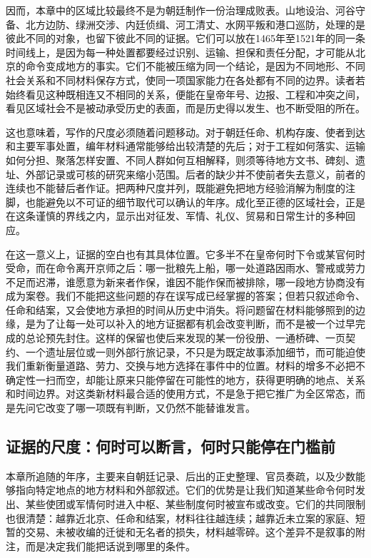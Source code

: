 因而，本章中的区域比较最终不是为朝廷制作一份治理成败表。山地设治、河谷守备、北方边防、绿洲交涉、内廷侦缉、河工清丈、水网平叛和港口巡防，处理的是彼此不同的对象，也留下彼此不同的证据。它们可以放在1465年至1521年的同一条时间线上，是因为每一种处置都要经过识别、运输、担保和责任分配，才可能从北京的命令变成地方的事实。它们不能被压缩为同一个结论，是因为不同地形、不同社会关系和不同材料保存方式，使同一项国家能力在各处都有不同的边界。读者若始终看见这种既相连又不相同的关系，便能在皇帝年号、边报、工程和冲突之间，看见区域社会不是被动承受历史的表面，而是历史得以发生、也不断受阻的所在。

这也意味着，写作的尺度必须随着问题移动。对于朝廷任命、机构存废、使者到达和主要军事处置，编年材料通常能够给出较清楚的先后；对于工程如何落实、运输如何分担、聚落怎样安置、不同人群如何互相解释，则须等待地方文书、碑刻、遗址、外部记录或可核的研究来缩小范围。后者的缺少并不使前者失去意义，前者的连续也不能替后者作证。把两种尺度并列，既能避免把地方经验消解为制度的注脚，也能避免以不可证的细节取代可以确认的年序。成化至正德的区域社会，正是在这条谨慎的界线之内，显示出对征发、军情、礼仪、贸易和日常生计的多种回应。

在这一意义上，证据的空白也有其具体位置。它多半不在皇帝何时下令或某官何时受命，而在命令离开京师之后：哪一批粮先上船，哪一处道路因雨水、警戒或劳力不足而迟滞，谁愿意为新来者作保，谁因不能作保而被排除，哪一段地方协商没有成为案卷。我们不能把这些问题的存在误写成已经掌握的答案；但若只叙述命令、任命和结案，又会使地方承担的时间从历史中消失。将问题留在材料能够照到的边缘，是为了让每一处可以补入的地方证据都有机会改变判断，而不是被一个过早完成的总论预先封住。这样的保留也使后来发现的某一份役册、一通桥碑、一页契约、一个遗址层位或一则外部行旅记录，不只是为既定故事添加细节，而可能迫使我们重新衡量道路、劳力、交换与地方选择在事件中的位置。材料的增多不必把不确定性一扫而空，却能让原来只能停留在可能性的地方，获得更明确的地点、关系和时间边界。对这类新材料最合适的使用方式，不是急于把它推广为全区常态，而是先问它改变了哪一项既有判断，又仍然不能替谁发言。

\subsection{证据的尺度：何时可以断言，何时只能停在门槛前}

本章所追随的年序，主要来自朝廷记录、后出的正史整理、官员奏疏，以及少数能够指向特定地点的地方材料和外部叙述。它们的优势是让我们知道某些命令何时发出、某些使团或军情何时进入中枢、某些制度何时被宣布或改变。它们的共同限制也很清楚：越靠近北京、任命和结案，材料往往越连续；越靠近未立案的家庭、短暂的交易、未被收编的迁徙和无名者的损失，材料越零碎。这个差异不是叙事的附注，而是决定我们能把话说到哪里的条件。


